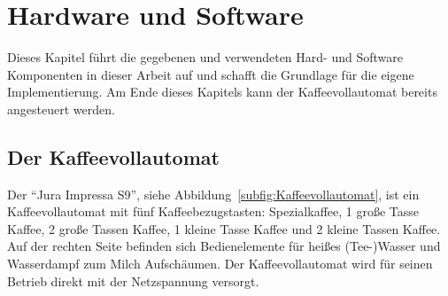 \chapter{Hardware und Software}
Dieses Kapitel führt die gegebenen und verwendeten Hard- und Software Komponenten in dieser Arbeit auf und schafft die Grundlage für die eigene Implementierung.
Am Ende dieses Kapitels kann der Kaffeevollautomat bereits angesteuert werden.

\section{Der Kaffeevollautomat}
Der "`Jura Impressa S9"', siehe Abbildung~\ref{subfig:Kaffeevollautomat}, ist ein Kaffeevollautomat mit fünf Kaffeebezugstasten: Spezialkaffee, 1 große Tasse Kaffee, 2 große Tassen Kaffee, 1 kleine Tasse Kaffee und 2 kleine Tassen Kaffee.
Auf der rechten Seite befinden sich Bedienelemente für heißes (Tee-)Wasser und Wasserdampf zum Milch Aufschäumen.
Der Kaffeevollautomat wird für seinen Betrieb direkt mit der Netzspannung versorgt.

